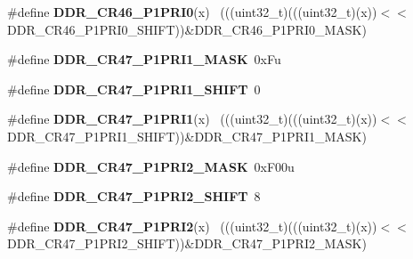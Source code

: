 \begin{DoxyCompactItemize}
\item 
\hypertarget{group___d_d_r___register___masks_gabf528150e909eb215347023bfcfad771}{}\#define {\bfseries D\+D\+R\+\_\+\+C\+R46\+\_\+\+P1\+P\+R\+I0}(x)                                          ~(((uint32\+\_\+t)(((uint32\+\_\+t)(x))$<$$<$D\+D\+R\+\_\+\+C\+R46\+\_\+\+P1\+P\+R\+I0\+\_\+\+S\+H\+I\+F\+T))\&D\+D\+R\+\_\+\+C\+R46\+\_\+\+P1\+P\+R\+I0\+\_\+\+M\+A\+S\+K)\label{group___d_d_r___register___masks_gabf528150e909eb215347023bfcfad771}

\item 
\hypertarget{group___d_d_r___register___masks_ga46639cb097517b7a7323f388b47eaf44}{}\#define {\bfseries D\+D\+R\+\_\+\+C\+R47\+\_\+\+P1\+P\+R\+I1\+\_\+\+M\+A\+S\+K}~0x\+Fu\label{group___d_d_r___register___masks_ga46639cb097517b7a7323f388b47eaf44}

\item 
\hypertarget{group___d_d_r___register___masks_ga6d7048f627371d6ed39c12538e59c120}{}\#define {\bfseries D\+D\+R\+\_\+\+C\+R47\+\_\+\+P1\+P\+R\+I1\+\_\+\+S\+H\+I\+F\+T}~0\label{group___d_d_r___register___masks_ga6d7048f627371d6ed39c12538e59c120}

\item 
\hypertarget{group___d_d_r___register___masks_ga2cc356773a031483551a79cec8f35c11}{}\#define {\bfseries D\+D\+R\+\_\+\+C\+R47\+\_\+\+P1\+P\+R\+I1}(x)                                          ~(((uint32\+\_\+t)(((uint32\+\_\+t)(x))$<$$<$D\+D\+R\+\_\+\+C\+R47\+\_\+\+P1\+P\+R\+I1\+\_\+\+S\+H\+I\+F\+T))\&D\+D\+R\+\_\+\+C\+R47\+\_\+\+P1\+P\+R\+I1\+\_\+\+M\+A\+S\+K)\label{group___d_d_r___register___masks_ga2cc356773a031483551a79cec8f35c11}

\item 
\hypertarget{group___d_d_r___register___masks_gac41140f9a89d2d2ce4d431e57f861bd7}{}\#define {\bfseries D\+D\+R\+\_\+\+C\+R47\+\_\+\+P1\+P\+R\+I2\+\_\+\+M\+A\+S\+K}~0x\+F00u\label{group___d_d_r___register___masks_gac41140f9a89d2d2ce4d431e57f861bd7}

\item 
\hypertarget{group___d_d_r___register___masks_ga6a4c2be364914528897b7c42b67d2a04}{}\#define {\bfseries D\+D\+R\+\_\+\+C\+R47\+\_\+\+P1\+P\+R\+I2\+\_\+\+S\+H\+I\+F\+T}~8\label{group___d_d_r___register___masks_ga6a4c2be364914528897b7c42b67d2a04}

\item 
\hypertarget{group___d_d_r___register___masks_gaff485eabac4a4e3ec2a07e6b864b4bba}{}\#define {\bfseries D\+D\+R\+\_\+\+C\+R47\+\_\+\+P1\+P\+R\+I2}(x)                                          ~(((uint32\+\_\+t)(((uint32\+\_\+t)(x))$<$$<$D\+D\+R\+\_\+\+C\+R47\+\_\+\+P1\+P\+R\+I2\+\_\+\+S\+H\+I\+F\+T))\&D\+D\+R\+\_\+\+C\+R47\+\_\+\+P1\+P\+R\+I2\+\_\+\+M\+A\+S\+K)\label{group___d_d_r___register___masks_gaff485eabac4a4e3ec2a07e6b864b4bba}


\end{DoxyCompactItemize}
